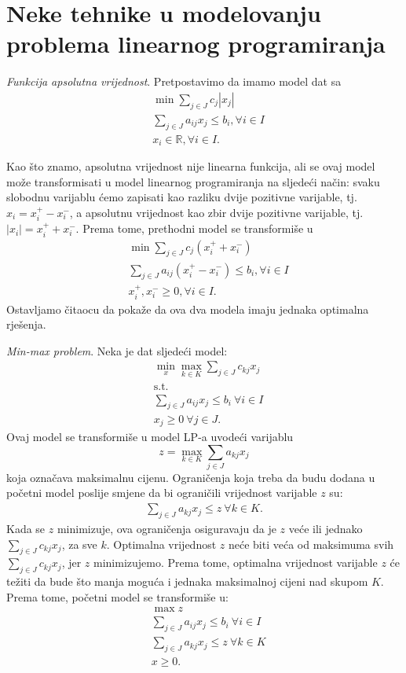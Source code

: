 \documentclass[a4paper, utf8, 11pt, colorlinks]{book}
\begin{document}
\section{Neke tehnike u modelovanju problema linearnog programiranja}

\emph{Funkcija apsolutna vrijednost}.   Pretpostavimo da imamo model dat sa 
\begin{align*}
	&\min \sum_{j \in J} c_j |x_j| \\
	& \sum_{j\in J} a_{ij} x_j \leq b_i, \forall i\in I \\
	& x_i \in \mathbb{R}, \forall i \in I.
\end{align*} 

Kao što znamo, apsolutna vrijednost nije linearna funkcija, ali se ovaj model može transformisati u model linearnog programiranja na sljedeći način: 
svaku slobodnu varijablu ćemo zapisati kao razliku dvije pozitivne varijable, tj.  $x_i = x_i^+ - x_i^-$, a apsolutnu vrijednost kao zbir dvije pozitivne varijable, tj. $|x_i|= x_i^+ + x_i^-$. Prema tome, prethodni model se transformiše  u 
\begin{align*}
	&\min \sum_{j \in J} c_j  (x_i^+ + x_i^-) \\
	&\sum_{j\in J} a_{ij} (  x_i^+ - x_i^- ) \leq b_i, \forall i\in I \\
	&  x_i^+, x_i^- \geq 0, \forall i \in I.
\end{align*}
Ostavljamo čitaocu da pokaže da ova dva modela imaju jednaka optimalna rješenja.

\emph{Min-max problem}. Neka je dat sljedeći model: 
\begin{align*}
	&\min_{x} \max_{k \in K} \sum_{j \in J} c_{kj} x_j \\
	&\mbox{s.t.} \nonumber \\
	& \sum_{j \in J} a_{ij} x_j \leq b_i\  \forall i \in I \\
	& x_j \geq 0\ \forall j \in J.
\end{align*}
Ovaj  model se transformiše u model LP-a uvodeći varijablu $$z=\max_{k \in K} \sum_{j \in J} a_{kj}x_j$$ koja označava maksimalnu cijenu. Ograničenja koja treba da budu dodana u početni model poslije smjene da bi ograničili vrijednost varijable $z$ su:
\begin{eqnarray}
	\sum_{j \in J} a_{kj} x_j \leq z\ \forall k \in K.
\end{eqnarray}
Kada se $z$ minimizuje, ova ograničenja osiguravaju da je $z$ veće ili jednako  $\sum_{j \in J} c_{kj}x_j$, za sve $k$. Optimalna vrijednost $z$ neće biti veća od maksimuma svih $\sum_{j \in J} c_{kj}x_j$, jer  $z$ minimizujemo. Prema tome, optimalna vrijednost varijable $z$ će težiti da bude što manja moguća i jednaka maksimalnoj cijeni nad skupom $K$. Prema tome, početni model se transformiše u:
\begin{align*}
	&\max z \\
	&\sum_{j \in J} a_{ij} x_j \leq b_i\  \forall i \in I \\ 
	& 	 \sum_{j \in J} a_{kj} x_j \leq z\ \forall k \in K \\
	& x \geq 0.
\end{align*}
\end{document}
